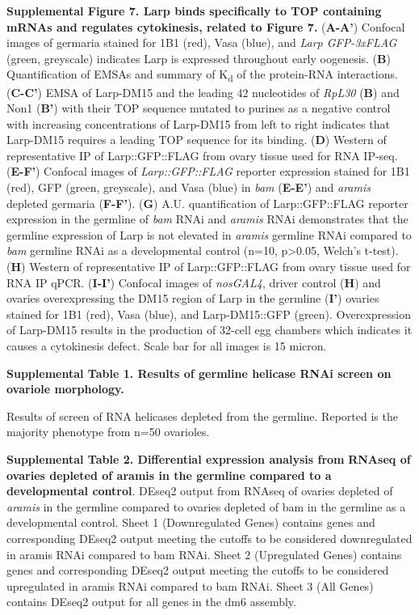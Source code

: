 \documentclass[12pt,twoside]{reedthesis}
\begin{document}
\textbf{Supplemental Figure 7. Larp binds specifically to TOP containing mRNAs
and regulates cytokinesis, related to Figure 7.} (\textbf{A-A'}) Confocal
images of germaria stained for 1B1 (red), Vasa (blue), and \emph{Larp
GFP-3xFLAG} (green, greyscale) indicates Larp is expressed throughout
early oogenesis. (\textbf{B}) Quantification of EMSAs and summary of K\textsubscript{d} of
the protein-RNA interactions. (\textbf{C-C'}) EMSA of Larp-DM15 and the
leading 42 nucleotides of \emph{RpL30} (\textbf{B}) and Non1 (\textbf{B'}) with their
TOP sequence mutated to purines as a negative control with increasing
concentrations of Larp-DM15 from left to right indicates that Larp-DM15
requires a leading TOP sequence for its binding. (\textbf{D}) Western of
representative IP of Larp::GFP::FLAG from ovary tissue used for RNA
IP-seq. (\textbf{E-F'}) Confocal images of \emph{Larp::GFP::FLAG} reporter
expression stained for 1B1 (red), GFP (green, greyscale), and Vasa
(blue) in \emph{bam} (\textbf{E-E'}) and \emph{aramis} depleted germaria (\textbf{F-F'}).
(\textbf{G}) A.U. quantification of Larp::GFP::FLAG reporter expression in
the germline of \emph{bam} RNAi and \emph{aramis} RNAi demonstrates that the
germline expression of Larp is not elevated in \emph{aramis} germline RNAi
compared to \emph{bam} germline RNAi as a developmental control (n=10,
p\textgreater0.05, Welch's t-test). (\textbf{H}) Western of representative IP of
Larp::GFP::FLAG from ovary tissue used for RNA IP qPCR. (\textbf{I-I'})
Confocal images of \emph{nosGAL4}, driver control (\textbf{H}) and ovaries
overexpressing the DM15 region of Larp in the germline (\textbf{I'}) ovaries
stained for 1B1 (red), Vasa (blue), and Larp-DM15::GFP (green).
Overexpression of Larp-DM15 results in the production of 32-cell egg
chambers which indicates it causes a cytokinesis defect. Scale bar for
all images is 15 micron.

\textbf{Supplemental Table 1. Results of germline helicase RNAi screen on
ovariole morphology.}

Results of screen of RNA helicases depleted from the germline. Reported
is the majority phenotype from n=50 ovarioles.

\textbf{Supplemental Table 2. Differential expression analysis from} \textbf{RNAseq
of ovaries depleted of aramis in the germline compared to a
developmental control}. DEseq2 output from RNAseq of ovaries depleted
of \emph{aramis} in the germline compared to ovaries depleted of bam in the
germline as a developmental control. Sheet 1 (Downregulated Genes)
contains genes and corresponding DEseq2 output meeting the cutoffs to be
considered downregulated in aramis RNAi compared to bam RNAi. Sheet 2
(Upregulated Genes) contains genes and corresponding DEseq2 output
meeting the cutoffs to be considered upregulated in aramis RNAi compared
to bam RNAi. Sheet 3 (All Genes) contains DEseq2 output for all genes in
the dm6 assembly.
\end{document}
